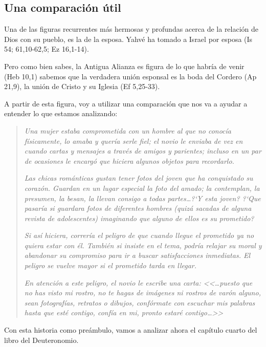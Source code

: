 \documentclass{article}
\begin{document}
\subsection{Una comparaci\'on \'util}

Una de las figuras recurrentes m\'as hermosas y profundas acerca de la relaci\'on de Dios con su pueblo, es la de la esposa. Yahv\'e ha tomado a Israel por esposa (Is 54; 61,10-62,5; Ez 16,1-14).

Pero como bien sabes, la Antigua Alianza es figura de lo que habr\'{i}a de venir (Heb 10,1) sabemos que la verdadera uni\'on esponsal es la boda del Cordero (Ap 21,9), la uni\'on de Cristo y su Iglesia (Ef 5,25-33).

A partir de esta figura, voy a utilizar una comparaci\'on que nos va a ayudar a entender lo que estamos analizando:

\begin{quote}
\emph{Una mujer estaba comprometida con un hombre al que no conoc\'{i}a f\'{i}sicamente, lo amaba y quer\'{i}a serle fiel; el novio le enviaba de vez en cuando cartas y mensajes a trav\'es de amigos y parientes; incluso en un par de ocasiones le encarg\'o que hiciera algunos objetos para recordarlo.}

\emph{Las chicas rom\'anticas gustan tener fotos del joven que ha conquistado su coraz\'on. Guardan en un lugar especial la foto del amado; la contemplan, la presumen, la besan, la llevan consigo a todas partes\ldots ?`Y esta joven? ?`Que pasar\'{i}a si guardara fotos de diferentes hombres (quiz\'a sacadas de alguna revista de adolescentes) imaginando que alguno de ellos es su prometido?}

\emph{Si as\'{i} hiciera, correr\'{i}a el peligro de que cuando llegue el prometido ya no quiera estar con \'el. Tambi\'en si insiste en el tema, podr\'{i}a relajar su moral y abandonar su compromiso para ir a buscar satisfacciones inmediatas. El peligro se vuelve mayor si el prometido tarda en llegar.}

\emph{En atenci\'on a este peligro, el novio le escribe una carta: <<{\ldots}puesto que no has visto mi rostro, no te hagas de im\'agenes ni rostros de var\'on alguno, sean fotograf\'{i}as, retratos o dibujos, conf\'ormate con escuchar mis palabras hasta que est\'e contigo, conf\'{i}a en mi, pronto estar\'e contigo\ldots>>}
\end{quote}

\noindent
Con esta historia como pre\'ambulo, vamos a analizar ahora el cap\'{i}tulo cuarto del libro del Deuteronomio.
\end{document}

